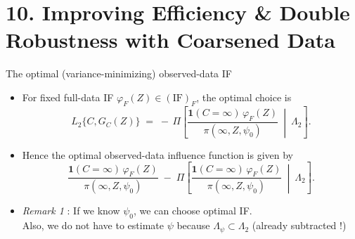 \documentclass[xcolor=dvipsnames,aspectratio=169]{beamer}
\newcommand{\1}{\mathbbm{1}}
\begin{document}
\section{10. Improving Efficiency \& Double Robustness with Coarsened Data}

\begin{frame}{The optimal (variance-minimizing) observed-data IF}
    \begin{tcolorbox}[colframe=Cyan,title=Theorem 10.1]
  \begin{itemize}
    \item For fixed full-data IF $\varphi_F(Z)\in(\mathrm{IF})_F$, the optimal choice is
    \[
      L_2\{C,G_C(Z)\}
      \;=\;
      -\,\Pi\!\left[
        \frac{\mathbf{1}(C=\infty)\,\varphi_F(Z)}{\pi(\infty,Z,\psi_0)}
        \ \middle|\ \Lambda_2
      \right].
    \]
    \item Hence the optimal observed-data influence function is given by
    \[
      \frac{\mathbf{1}(C=\infty)\,\varphi_F(Z)}{\pi(\infty,Z,\psi_0)}
      \;-\;
      \Pi\!\left[
        \frac{\mathbf{1}(C=\infty)\,\varphi_F(Z)}{\pi(\infty,Z,\psi_0)}
        \ \middle|\ \Lambda_2
      \right].
    \]
  \end{itemize}
\end{tcolorbox}
\begin{itemize}
    \item \textit{Remark 1} : If we know $\psi_0$, we can choose optimal IF. \\
    Also, we do not have to estimate $\psi$ because $\Lambda_{\psi}\subset \Lambda_2$ (already subtracted !)
\end{itemize}
\end{frame}
\end{document}
